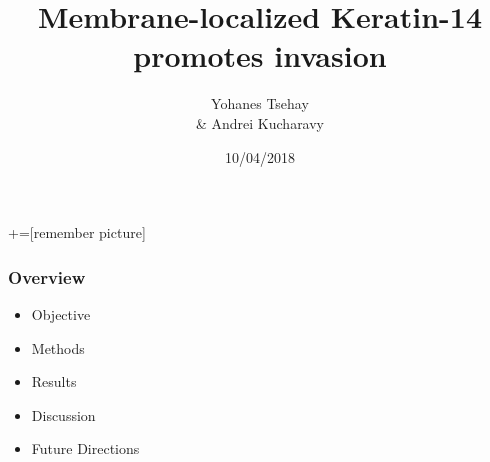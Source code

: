 \documentclass{beamer} %
\title{Membrane-localized Keratin-14 \\ promotes invasion}
\author{Yohanes Tsehay \\ \& Andrei Kucharavy}
\institute{Joel Bader's Lab}
\date{10/04/2018}
\begin{document}
+=[remember picture]

\everymath{\displaystyle}

\frame{\titlepage}

\begin{frame}
\frametitle{Overview}

\begin{itemize}
		\item Objective
		\item Methods
		\item Results
		\item Discussion
		\item Future Directions
\end{itemize}

\end{frame}




\end{document}
